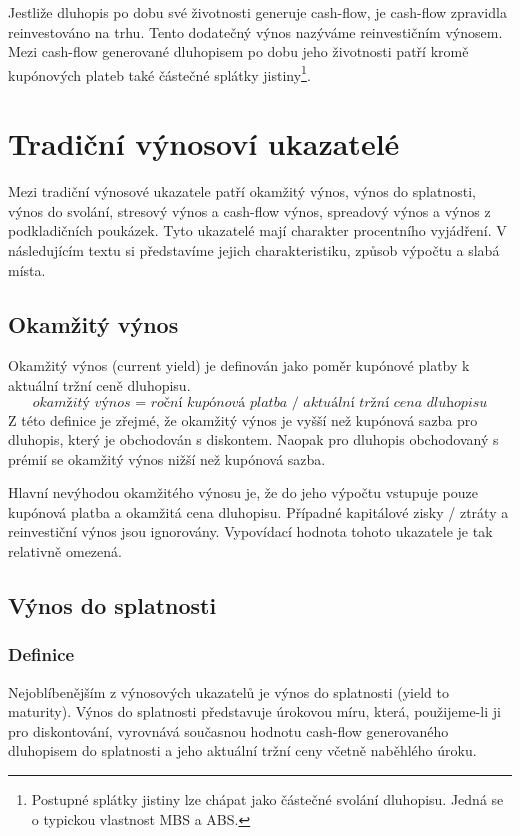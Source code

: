 \documentclass[a4paper]{book}
\begin{document}
Jestliže dluhopis po dobu své životnosti generuje cash-flow, je cash-flow zpravidla reinvestováno na trhu. Tento dodatečný výnos nazýváme reinvestičním výnosem. Mezi cash-flow generované dluhopisem po dobu jeho životnosti patří kromě kupónových plateb také částečné splátky jistiny\footnote{Postupné splátky jistiny lze chápat jako částečné svolání dluhopisu. Jedná se o typickou vlastnost MBS a ABS.}.

\section{Tradiční výnosoví ukazatelé}

Mezi tradiční výnosové ukazatele patří okamžitý výnos, výnos do splatnosti, výnos do svolání, stresový výnos a cash-flow výnos, spreadový výnos a výnos z podkladičních poukázek. Tyto ukazatelé mají charakter procentního vyjádření. V následujícím textu si představíme jejich charakteristiku, způsob výpočtu a slabá místa.

\subsection{Okamžitý výnos}

Okamžitý výnos (current yield) je definován jako poměr kupónové platby k aktuální tržní ceně dluhopisu.
\begin{equation*}
\textit{okamžitý výnos = roční kupónová platba / aktuální tržní cena dluhopisu}
\end{equation*}
Z této definice je zřejmé, že okamžitý výnos je vyšší než kupónová sazba pro dluhopis, který je obchodován s diskontem. Naopak pro dluhopis obchodovaný s prémií se okamžitý výnos nižší než kupónová sazba.

Hlavní nevýhodou okamžitého výnosu je, že do jeho výpočtu vstupuje pouze kupónová platba a okamžitá cena dluhopisu. Případné kapitálové zisky / ztráty a reinvestiční výnos jsou ignorovány. Vypovídací hodnota tohoto ukazatele je tak relativně omezená.

\subsection{Výnos do splatnosti}

\subsubsection{Definice}

Nejoblíbenějším z výnosových ukazatelů je výnos do splatnosti (yield to maturity). Výnos do splatnosti představuje úrokovou míru, která, použijeme-li ji pro diskontování, vyrovnává současnou hodnotu cash-flow generovaného dluhopisem do splatnosti a jeho aktuální tržní ceny včetně naběhlého úroku.
\end{document}
